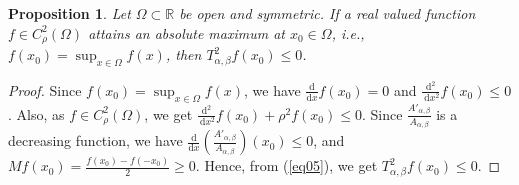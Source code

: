 \documentclass[a4paper,11pt, reqno]{amsart}
\theoremstyle{plain}
\newtheorem{proposition}[theorem]{Proposition}
\theoremstyle{definition}
\theoremstyle{remark}
\begin{document}
\begin{proposition}\label{pro1}
Let $\Omega \subset \mathbb{R}$ be open and symmetric. If a real valued function $f \in C^2_\rho(\Omega)$ attains an absolute maximum at $x_0 \in \Omega$,  i.e., $f(x_0)=\sup _{x \in \Omega} f(x)$, then $T^2_{\alpha, \beta} f(x_0 ) \leq 0$.
\end{proposition}
\begin{proof}
Since $f\left(x_0\right)=\sup _{x \in \Omega} f(x)$, we have $\frac{\mathrm{d}}{\mathrm{d} x} f\left(x_0\right)=0$ and $\frac{\mathrm{d}^2}{\mathrm{~d} x^2} f\left(x_0\right) \leq 0$. Also, as $f \in C^2_\rho(\Omega)$, we get $\frac{\mathrm{d}^2}{\mathrm{~d}x^2} f(x_0) + \rho^2 f(x_0) \leq 0$. Since $\frac{A'_{\alpha, \beta}}{A_{\alpha, \beta}}$ is a decreasing function, we have $\frac{\mathrm{d}}{\mathrm{d} x} \left( \frac{A'_{\alpha, \beta}}{A_{\alpha, \beta}} \right)(x_0) \leq 0$, and $ Mf(x_0)= \frac{f\left(x_0\right)-f\left(-x_0\right)}{2} \geq 0$. Hence, from (\ref{eq05}), we get $T^2_{\alpha, \beta} f(x_0 ) \leq 0$.
\end{proof}  
  
\end{document}
